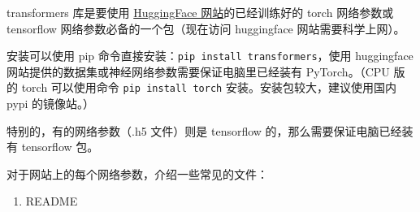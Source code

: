 
\begin{issues}
\issueDraft
\end{issues}

transformers 库是要使用 \href{https://huggingface.co}{HuggingFace 网站}的已经训练好的 torch 网络参数或 tensorflow 网络参数必备的一个包（现在访问 huggingface 网站需要科学上网）。

安装可以使用 pip 命令直接安装：\verb`pip install transformers`，使用 huggingface 网站提供的数据集或神经网络参数需要保证电脑里已经装有 PyTorch。（CPU 版的 torch 可以使用命令 \verb`pip install torch` 安装。安装包较大，建议使用国内 pypi 的镜像站。）

特别的，有的网络参数（.h5 文件）则是 tensorflow 的，那么需要保证电脑已经装有 tensorflow 包。

对于网站上的每个网络参数，介绍一些常见的文件：
\begin{enumerate}
\item README
\end{enumerate}
